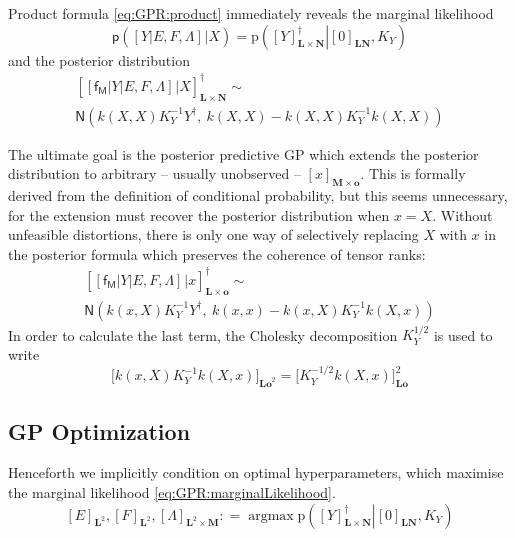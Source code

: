 \documentclass[preprint,12pt]{elsarticle}
\newcommand*{\M}[1]{\ensuremath{#1}\xspace}
\newcommand*{\x}{\times}
\newcommand*{\mi}[1]{\mathbf{#1}}
\newcommand*{\rv}[1]{\mathsf{#1}}
\newcommand*{\te}[2][]{\left\lbrack{#2}\right\rbrack_{#1}}
\newcommand*{\tte}[2][]{\lbrack{#2}\rbrack_{#1}}
\newcommand*{\prob}[3]{\M{\mathrm{p}\!\left(\left.{#1}\right\vert{#2,#3}\right)}}
\newcommand*{\deq}{\M{\mathrel{\mathop:}=}}
\newcommand*{\gauss}[2]{\mathsf{N}\!\left({#1,#2}\right)}
\DeclareMathOperator*{\argmax}{argmax}
\begin{document}
        Product formula \cref{eq:GPR:product} immediately reveals the marginal likelihood
        \begin{equation} \label{eq:GPR:marginalLikelihood}
            \mathsf{p}\!\left(\te{Y \vert E,F,\Lambda} \big\vert X\right)
            = \prob{\te[\mi{L\x N}]{Y}^{\dagger}}{\te[\mi{LN}]{0}}{K_Y}
        \end{equation}
        and the posterior distribution
        \begin{multline*}
            \te[\mi{L\x N}]{\te{\rv{f_M} \vert Y \vert E,F,\Lambda} \big\vert X}^{\dagger} \sim \\
            \gauss{k(X,X) K_{Y}^{-1} Y^{\dagger}}{\ k(X,X) - k(X,X) K_{Y}^{-1} k(X,X)}
        \end{multline*}

        The ultimate goal is the posterior predictive GP which extends the posterior distribution to arbitrary -- usually unobserved -- $\te[\mi{M}\x\mi{o}]{x}$. This is formally derived from the definition of conditional probability, but this seems unnecessary, for the extension must recover the posterior distribution when $x=X$. Without unfeasible distortions, there is only one way of selectively replacing $X$ with $x$ in the posterior formula which preserves the coherence of tensor ranks:
        \begin{multline} \label{def:GPR:Predictive}
            \te[\mi{L\x o}]{\te{\rv{f_M} \vert Y \vert E,F,\Lambda} \big\vert x}^{\dagger} \sim \\
            \gauss{k(x,X) K_{Y}^{-1} Y^{\dagger}}{\ k(x,x) - k(x,X) K_{Y}^{-1} k(X,x)}
        \end{multline}
        In order to calculate the last term, the Cholesky decomposition $K_{Y}^{1/2}$ is used to write
        \begin{equation*}
            \tte[\mi{Lo}^{2}]{k(x,X) K_{Y}^{-1} k(X,x)} = \tte[\mi{Lo}]{K_{Y}^{-1/2} k(X,x)}^{2}
        \end{equation*}

    \subsection{GP Optimization} \label{sub:GPR:Optimization}
        Henceforth we implicitly condition on optimal hyperparameters, which maximise the marginal likelihood \cref{eq:GPR:marginalLikelihood}.
        \begin{equation} \label{eq:GPR:hyperparameters}
            \te[\mi{L}^{2}]{E},\te[\mi{L}^{2}]{F},\te[\mi{L}^{2}\x\mi{M}]{\Lambda} \deq \argmax \prob{\te[\mi{L\x N}]{Y}^{\dagger}}{\te[\mi{LN}]{0}}{K_Y}
        \end{equation}
\end{document}
